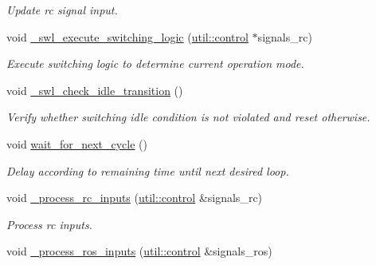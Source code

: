 \begin{DoxyCompactItemize}
\begin{DoxyCompactList}\small\item\em Update rc signal input. \end{DoxyCompactList}\item 
void \hyperlink{classSPMB_1_1StateMachine_a1c01752d1ec267a1dc85924d453db6ce}{\+\_\+swl\+\_\+execute\+\_\+switching\+\_\+logic} (\hyperlink{structSPMB_1_1util_1_1control}{util\+::control} $\ast$signals\+\_\+rc)\hypertarget{classSPMB_1_1StateMachine_a1c01752d1ec267a1dc85924d453db6ce}{}\label{classSPMB_1_1StateMachine_a1c01752d1ec267a1dc85924d453db6ce}

\begin{DoxyCompactList}\small\item\em Execute switching logic to determine current operation mode. \end{DoxyCompactList}\item 
void \hyperlink{classSPMB_1_1StateMachine_aefec64633728ccc393ff10752fe76243}{\+\_\+swl\+\_\+check\+\_\+idle\+\_\+transition} ()\hypertarget{classSPMB_1_1StateMachine_aefec64633728ccc393ff10752fe76243}{}\label{classSPMB_1_1StateMachine_aefec64633728ccc393ff10752fe76243}

\begin{DoxyCompactList}\small\item\em Verify whether switching idle condition is not violated and reset otherwise. \end{DoxyCompactList}\item 
void \hyperlink{classSPMB_1_1StateMachine_ad5b8e99beb2d19a29491429c45249179}{wait\+\_\+for\+\_\+next\+\_\+cycle} ()\hypertarget{classSPMB_1_1StateMachine_ad5b8e99beb2d19a29491429c45249179}{}\label{classSPMB_1_1StateMachine_ad5b8e99beb2d19a29491429c45249179}

\begin{DoxyCompactList}\small\item\em Delay according to remaining time until next desired loop. \end{DoxyCompactList}\item 
void \hyperlink{classSPMB_1_1StateMachine_a46daaffbfb6385c230685dcba703314f}{\+\_\+process\+\_\+rc\+\_\+inputs} (\hyperlink{structSPMB_1_1util_1_1control}{util\+::control} \&signals\+\_\+rc)\hypertarget{classSPMB_1_1StateMachine_a46daaffbfb6385c230685dcba703314f}{}\label{classSPMB_1_1StateMachine_a46daaffbfb6385c230685dcba703314f}

\begin{DoxyCompactList}\small\item\em Process rc inputs. \end{DoxyCompactList}\item 
void \hyperlink{classSPMB_1_1StateMachine_a6ffc09455280e241a558f1b46441aa9d}{\+\_\+process\+\_\+ros\+\_\+inputs} (\hyperlink{structSPMB_1_1util_1_1control}{util\+::control} \&signals\+\_\+ros)\hypertarget{classSPMB_1_1StateMachine_a6ffc09455280e241a558f1b46441aa9d}{}\label{classSPMB_1_1StateMachine_a6ffc09455280e241a558f1b46441aa9d}


\end{DoxyCompactItemize}
